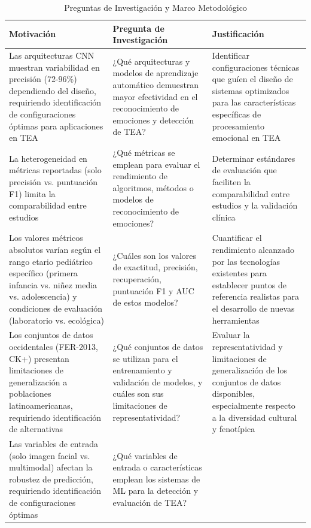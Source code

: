 \documentclass{ieeeaccess}
\begin{document}
	\begin{table}[htbp]
		\caption{Preguntas de Investigación y Marco Metodológico}
		\label{tab:preguntas}
		\centering
		\begin{tabular}{|p{140pt}|p{160pt}|p{170pt}|}
			\hline
			\textbf{Motivación} & \textbf{Pregunta de Investigación} & \textbf{Justificación} \\
			\hline
			Las arquitecturas CNN muestran variabilidad en precisión (72-96\%) dependiendo del diseño, requiriendo identificación de configuraciones óptimas para aplicaciones en TEA 
			& ¿Qué arquitecturas y modelos de aprendizaje automático demuestran mayor efectividad en el reconocimiento de emociones y detección de TEA? 
			& Identificar configuraciones técnicas que guíen el diseño de sistemas optimizados para las características específicas de procesamiento emocional en TEA \\
			\hline
			La heterogeneidad en métricas reportadas (solo precisión vs. puntuación F1) limita la comparabilidad entre estudios 
			& ¿Qué métricas se emplean para evaluar el rendimiento de algoritmos, métodos o modelos de reconocimiento de emociones? 
			& Determinar estándares de evaluación que faciliten la comparabilidad entre estudios y la validación clínica \\
			\hline
			Los valores métricos absolutos varían según el rango etario pediátrico específico (primera infancia vs. niñez media vs. adolescencia) y condiciones de evaluación (laboratorio vs. ecológica) 
			& ¿Cuáles son los valores de exactitud, precisión, recuperación, puntuación F1 y AUC de estos modelos? 
			& Cuantificar el rendimiento alcanzado por las tecnologías existentes para establecer puntos de referencia realistas para el desarrollo de nuevas herramientas \\
			\hline
			Los conjuntos de datos occidentales (FER-2013, CK+) presentan limitaciones de generalización a poblaciones latinoamericanas, requiriendo identificación de alternativas 
			& ¿Qué conjuntos de datos se utilizan para el entrenamiento y validación de modelos, y cuáles son sus limitaciones de representatividad? 
			& Evaluar la representatividad y limitaciones de generalización de los conjuntos de datos disponibles, especialmente respecto a la diversidad cultural y fenotípica \\
			\hline
			Las variables de entrada (solo imagen facial vs. multimodal) afectan la robustez de predicción, requiriendo identificación de configuraciones óptimas 
			& ¿Qué variables de entrada o características emplean los sistemas de ML para la detección y evaluación de TEA? 

\end{tabular}
\end{table}
\end{document}
